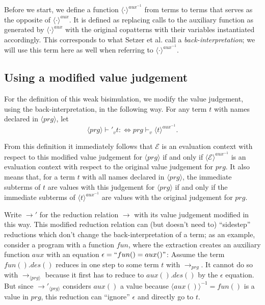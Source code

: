Before we start, we define a function $\langle \cdot \rangle^{aux^{-1}}$ from terms to terms that serves as the opposite of $\langle \cdot \rangle^{aux}$. It is defined as replacing calls to the auxiliary function as generated by $\langle \cdot \rangle^{aux}$ with the original copatterns with their variables instantiated accordingly. This corresponds to what Setzer et al.\cite{setzer14unnesting} call a \textit{back-interpretation}; we will use this term here as well when referring to $\langle \cdot \rangle^{aux^{-1}}$.

\subsection{Using a modified value judgement}

For the definition of this weak bisimulation, we modify the value judgement, using the back-interpretation, in the following way. For any term $t$ with names declared in $\langle prg \rangle$, let
\[
\langle prg \rangle \vdash'_v t :\iff prg \vdash_v \langle t \rangle^{aux^{-1}}.
\]

From this definition it immediately follows that $\mathcal{E}$ is an evaluation context with respect to this modified value judgement for $\langle prg \rangle$ if and only if $\langle \mathcal{E} \rangle^{aux^{-1}}$ is an evaluation context with respect to the original value judgement for $prg$. It also means that, for a term $t$ with all names declared in $\langle prg \rangle$, the immediate subterms of $t$ are values with this judgement for $\langle prg \rangle$ if and only if the immediate subterms of $\langle t \rangle^{aux^{-1}}$ are values with the original judgement for $prg$.

Write $\longrightarrow'$ for the reduction relation $\longrightarrow$ with its value judgement modified in this way. This modified reduction relation can (but doesn't need to) ``sidestep'' reductions which don't change the back-interpretation of a term; as an example, consider a program with a function $fun$, where the extraction creates an auxiliary function $aux$ with an equation $\epsilon = ``fun() = aux()"$: Assume the term $fun().des()$ reduces in one step to some term $t$ with $\longrightarrow_{prg}$. It cannot do so with $\longrightarrow_{\langle prg \rangle}$ because it first has to reduce to $aux().des()$ by the $\epsilon$ equation. But since $\longrightarrow'_{\langle prg \rangle}$ considers $aux()$ a value because $\langle aux() \rangle^{-1} = fun()$ is a value in $prg$, this reduction can ``ignore'' $\epsilon$ and directly go to $t$.

